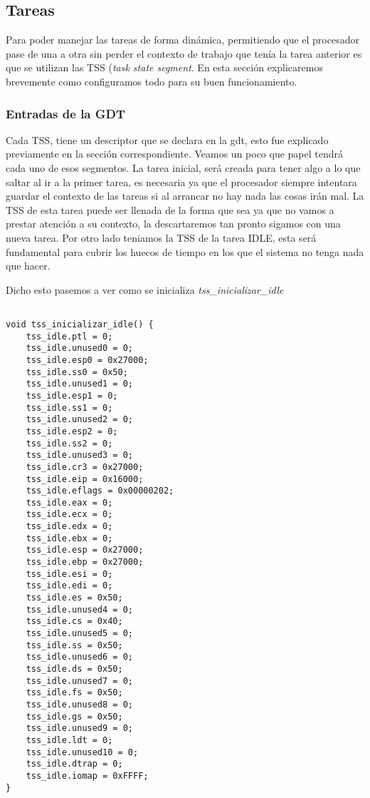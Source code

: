 

\subsection{Tareas}
Para poder manejar las tareas de forma dinámica, permitiendo que el procesador pase de una a otra sin perder el contexto de trabajo que tenía la tarea anterior es que se utilizan las TSS (\textit{task state segment}. En esta sección explicaremos brevemente como configuramos todo para su buen funcionamiento.

\subsubsection{Entradas de la GDT}
Cada TSS, tiene un descriptor que se declara en la gdt, esto fue explicado previamente en la sección correspondiente. Veamos un poco que papel tendrá cada uno de esos segmentos. La tarea inicial, será creada para tener algo a lo que saltar al ir a la primer tarea, es necesaria ya que el procesador siempre intentara guardar el contexto de las tareas si al arrancar no hay nada las cosas irán mal. La TSS de esta tarea puede ser llenada de la forma que sea ya que no vamos a prestar atención a su contexto, la descartaremos tan pronto sigamos con una nueva tarea.
Por otro lado teniamos la TSS de la tarea IDLE, esta será fundamental para cubrir los huecos de tiempo en los que el sistema no tenga nada que hacer.

Dicho esto pasemos a ver como se inicializa \textit{tss\_inicializar\_idle}


\begin{lstlisting}

void tss_inicializar_idle() {
	tss_idle.ptl = 0;
    tss_idle.unused0 = 0;
    tss_idle.esp0 = 0x27000;
    tss_idle.ss0 = 0x50;
    tss_idle.unused1 = 0;
    tss_idle.esp1 = 0;
    tss_idle.ss1 = 0;
    tss_idle.unused2 = 0;
    tss_idle.esp2 = 0;
    tss_idle.ss2 = 0;
    tss_idle.unused3 = 0;
    tss_idle.cr3 = 0x27000;
    tss_idle.eip = 0x16000;
    tss_idle.eflags = 0x00000202;
    tss_idle.eax = 0;
    tss_idle.ecx = 0;
    tss_idle.edx = 0;
    tss_idle.ebx = 0;
    tss_idle.esp = 0x27000;
    tss_idle.ebp = 0x27000;
    tss_idle.esi = 0;
    tss_idle.edi = 0;
    tss_idle.es = 0x50;
    tss_idle.unused4 = 0;
    tss_idle.cs = 0x40;
    tss_idle.unused5 = 0;
    tss_idle.ss = 0x50;
    tss_idle.unused6 = 0;
    tss_idle.ds = 0x50;
    tss_idle.unused7 = 0;
    tss_idle.fs = 0x50;
    tss_idle.unused8 = 0;
    tss_idle.gs = 0x50;
    tss_idle.unused9 = 0;
    tss_idle.ldt = 0;
    tss_idle.unused10 = 0;
    tss_idle.dtrap = 0;
    tss_idle.iomap = 0xFFFF;
}
\end{lstlisting}

